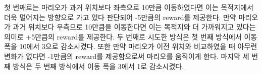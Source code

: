 
첫 번째로는 마리오가 과거 위치보다 좌측으로 10만큼 이동하였다면 이는 목적지에서 더욱 멀어지는 방향으로 가고 있다 판단되어 -5만큼의 reward를 제공한다. 
만약 마리오가 과거 위치보다 우측으로 10만큼을 이동한다면 이는 목적지와 더 가까워지고 있다는 의미로 +5만큼의 reward를 제공한다. 
두 번째로 시도한 방식은 첫 번째 방식에서 이동 폭을 10에서 3으로 감소시켰다.
또한 만약 마리오가 이전 위치와 비교하였을 때 아무런 변화가 없다면 -1만큼의 reward를 제공함으로써 마리오를 움직이게 한다.
마지막 세 번째 방식은 두 번째 방식에서 이동 폭을 3에서 1로 감소시켰다.